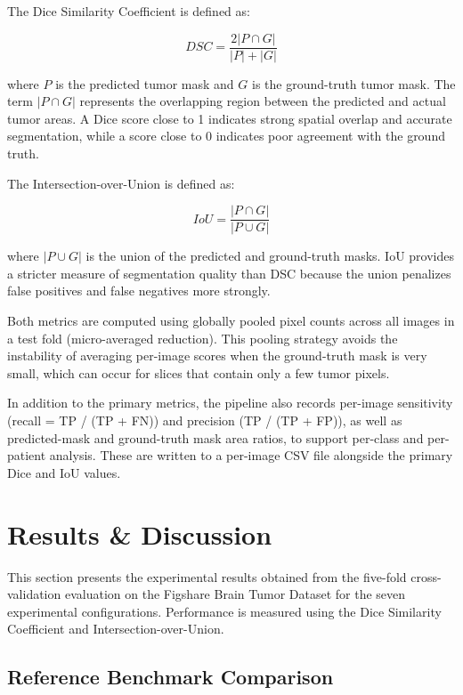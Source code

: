 \documentclass[a4paper,12pt]{article}
\begin{document}
The Dice Similarity Coefficient is defined as:

\begin{equation}
    DSC = \frac{2 |P \cap G|}{|P| + |G|}
\end{equation}

where $P$ is the predicted tumor mask and $G$ is the ground-truth tumor mask.
The term $|P \cap G|$ represents the overlapping region between the predicted and actual tumor
areas. A Dice score close to 1 indicates strong spatial overlap and accurate segmentation, while
a score close to 0 indicates poor agreement with the ground truth.

The Intersection-over-Union is defined as:

\begin{equation}
    IoU = \frac{|P \cap G|}{|P \cup G|}
\end{equation}

where $|P \cup G|$ is the union of the predicted and ground-truth masks. IoU provides a
stricter measure of segmentation quality than DSC because the union penalizes false positives
and false negatives more strongly.

Both metrics are computed using globally pooled pixel counts across all images in a test fold
(micro-averaged reduction). This pooling strategy avoids the instability of averaging per-image
scores when the ground-truth mask is very small, which can occur for slices that contain only a
few tumor pixels.

In addition to the primary metrics, the pipeline also records per-image sensitivity
(recall = TP / (TP + FN)) and precision (TP / (TP + FP)), as well as predicted-mask and
ground-truth mask area ratios, to support per-class and per-patient analysis. These are written
to a per-image CSV file alongside the primary Dice and IoU values.


\section{Results \& Discussion}
\label{sec:results}

This section presents the experimental results obtained from the five-fold cross-validation
evaluation on the Figshare Brain Tumor Dataset for the seven experimental configurations.
Performance is measured using the Dice Similarity Coefficient and Intersection-over-Union.

\subsection{Reference Benchmark Comparison}
\label{sub:reference_benchmark}
\end{document}
